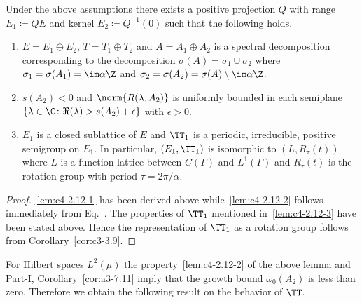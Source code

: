\begin{lemma}\label{lem:c4-2.12}%
Under the above assumptions there exists a positive projection $Q$ with range $E_{1} \coloneqq QE$ and kernel $E_{2} \coloneqq Q^{-1}(0)$ such that the following holds.
\begin{enumerate}[\upshape (i)]
\item \label{lem:c4-2.12-1}
$E = E_{1} \oplus E_{2}$, $T = T_{1} \oplus T_{2}$ and $A = A_{1} \oplus A_{2}$ is a spectral decomposition corresponding to the decomposition $\sigma(A) = \sigma_{1} \cup \sigma_{2}$ where $\sigma_{1} = \sigma(A_{1}) = \im\alpha\Z$ and $\sigma_{2} = \sigma(A_{2}) = \sigma(A) \setminus \im\alpha\Z$.

\item \label{lem:c4-2.12-2}
$s(A_{2}) < 0$ and $\norm{R(\lambda,A_{2})}$ is uniformly bounded in each semiplane\\ 
$\{\lambda \in \C \colon \Re(\lambda) > s(A_{2}) + \epsilon\}$ with $\epsilon > 0$.

\item \label{lem:c4-2.12-3}
$E_{1}$ is a closed sublattice of\/ $E$ and $\TT_{1}$ is a periodic, irreducible, positive semigroup on $E_{1}$.
In particular, $(E_{1},\TT_{1})$ is isomorphic to $(L,R_{\tau}(t))$ where $L$ is a function lattice between $C(\Gamma)$ and $L^{1}(\Gamma)$ and $R_{\tau}(t)$ is the rotation group with period $\tau = 2\pi/\alpha$.
\end{enumerate}
\end{lemma}
\begin{proof}
\ref{lem:c4-2.12-1} has been derived above while~\ref{lem:c4-2.12-2} follows immediately from Eq.~.
The properties of\/ $\TT_{1}$ mentioned in~\ref{lem:c4-2.12-3} have been stated above.
Hence the representation of\/ $\TT_{1}$ as a rotation group follows from Corollary~\ref{cor:c3-3.9}.
\end{proof}
For Hilbert spaces $L^{2}(\mu)$ the property~\ref{lem:c4-2.12-2} of the above lemma and Part-I, Corollary~\ref{cor:a3-7.11} imply that the growth bound $\omega_{0}(A_{2})$ is less than zero.
Therefore we obtain the following result on the behavior of\/ $\TT$.
